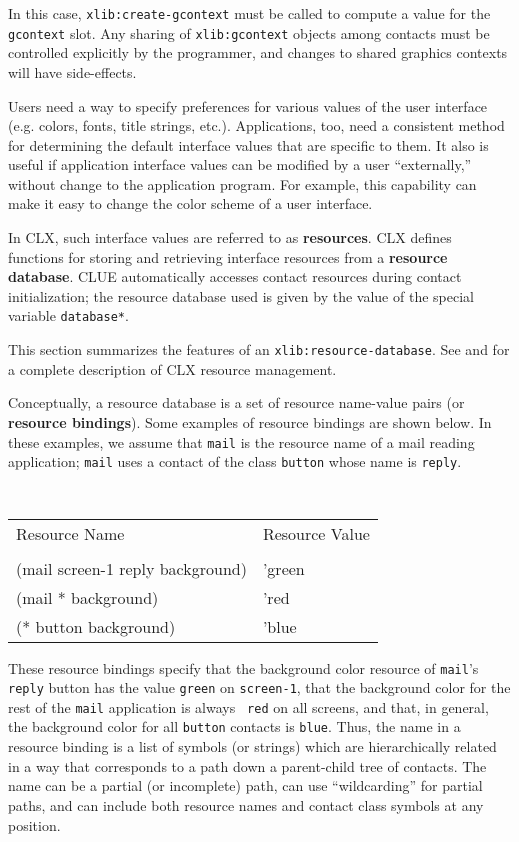 In this case, {\tt xlib:create-gcontext} must be called to compute a value for the
{\tt gcontext} slot.  Any sharing of {\tt xlib:gcontext} objects among
contacts must be controlled  explicitly by the programmer, and changes to shared
graphics contexts will have side-effects.


Users need a way to specify preferences for various values of the user interface
(e.g. colors, fonts, title strings, etc.). Applications, too, need a
consistent method
for determining the default interface values that are specific to them. It also
is useful if application interface values can be modified by a user
``externally,'' without change to the application program. For example, this
capability can make it easy to change the color scheme of a user
interface.  

In CLX, such interface values
are referred to as {\bf resources}. CLX defines functions for
storing and retrieving interface resources from  a {\bf resource
database}. CLUE automatically accesses contact
resources during contact initialization; the resource database used is given by
the value of the special variable {\tt *database*}.

This section summarizes the features of an {\tt xlib:resource-database}.
See \cite{xlib} and \cite{clx} for a complete description of CLX resource
management.

Conceptually, a resource database is a set of resource name-value pairs (or 
{\bf resource bindings}). Some examples of resource
bindings are shown below. In these examples, we assume that {\tt mail} is the
resource name of a mail reading application; {\tt mail} uses a contact of the
class {\tt button} whose name is {\tt reply}.

\begin{center}
\tt
\begin{tabular}{ll}
{\rm Resource Name} & {\rm Resource Value}\\
\\
(mail screen-1 reply background) & 'green\\
(mail * background)       & 'red\\
(* button background)     & 'blue
\end{tabular}
\rm
\end{center}

These resource bindings specify that the background color resource of
{\tt mail}'s {\tt reply} button has the value {\tt green} on {\tt screen-1}, that
the background color for the rest of the {\tt mail} application is always {\tt
red} on all screens, and that, in general, the background color for all {\tt button}
contacts is {\tt blue}.  Thus, the name in a resource binding is a list
of symbols (or strings) which are hierarchically related in a way that
corresponds to
a path down a parent-child tree of contacts.  The name can be a partial
(or incomplete) path, can use ``wildcarding'' for partial paths, and can include both
resource names and contact class symbols at any position.

